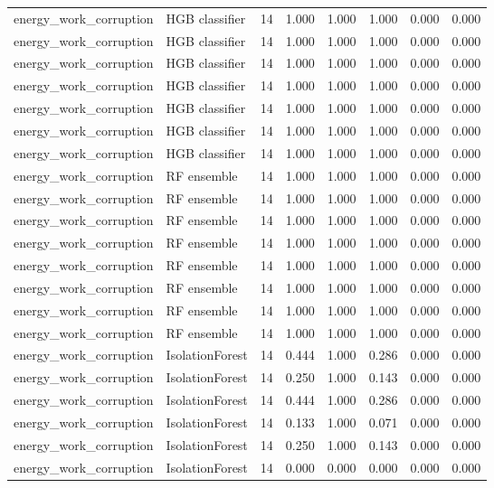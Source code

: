 {\begin{longtable}{llrrrrrr}
energy\_work\_corruption & HGB classifier & 14 & 1.000 & 1.000 & 1.000 & 0.000 & 0.000 \\
energy\_work\_corruption & HGB classifier & 14 & 1.000 & 1.000 & 1.000 & 0.000 & 0.000 \\
energy\_work\_corruption & HGB classifier & 14 & 1.000 & 1.000 & 1.000 & 0.000 & 0.000 \\
energy\_work\_corruption & HGB classifier & 14 & 1.000 & 1.000 & 1.000 & 0.000 & 0.000 \\
energy\_work\_corruption & HGB classifier & 14 & 1.000 & 1.000 & 1.000 & 0.000 & 0.000 \\
energy\_work\_corruption & HGB classifier & 14 & 1.000 & 1.000 & 1.000 & 0.000 & 0.000 \\
energy\_work\_corruption & HGB classifier & 14 & 1.000 & 1.000 & 1.000 & 0.000 & 0.000 \\
energy\_work\_corruption & RF ensemble & 14 & 1.000 & 1.000 & 1.000 & 0.000 & 0.000 \\
energy\_work\_corruption & RF ensemble & 14 & 1.000 & 1.000 & 1.000 & 0.000 & 0.000 \\
energy\_work\_corruption & RF ensemble & 14 & 1.000 & 1.000 & 1.000 & 0.000 & 0.000 \\
energy\_work\_corruption & RF ensemble & 14 & 1.000 & 1.000 & 1.000 & 0.000 & 0.000 \\
energy\_work\_corruption & RF ensemble & 14 & 1.000 & 1.000 & 1.000 & 0.000 & 0.000 \\
energy\_work\_corruption & RF ensemble & 14 & 1.000 & 1.000 & 1.000 & 0.000 & 0.000 \\
energy\_work\_corruption & RF ensemble & 14 & 1.000 & 1.000 & 1.000 & 0.000 & 0.000 \\
energy\_work\_corruption & RF ensemble & 14 & 1.000 & 1.000 & 1.000 & 0.000 & 0.000 \\
energy\_work\_corruption & IsolationForest & 14 & 0.444 & 1.000 & 0.286 & 0.000 & 0.000 \\
energy\_work\_corruption & IsolationForest & 14 & 0.250 & 1.000 & 0.143 & 0.000 & 0.000 \\
energy\_work\_corruption & IsolationForest & 14 & 0.444 & 1.000 & 0.286 & 0.000 & 0.000 \\
energy\_work\_corruption & IsolationForest & 14 & 0.133 & 1.000 & 0.071 & 0.000 & 0.000 \\
energy\_work\_corruption & IsolationForest & 14 & 0.250 & 1.000 & 0.143 & 0.000 & 0.000 \\
energy\_work\_corruption & IsolationForest & 14 & 0.000 & 0.000 & 0.000 & 0.000 & 0.000 \\

\end{longtable}}
